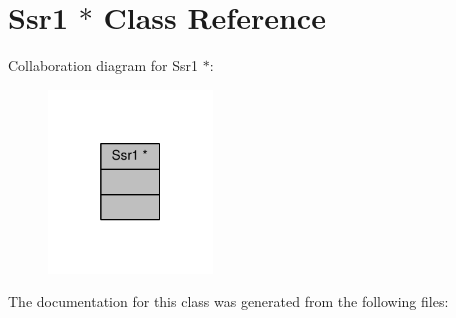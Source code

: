 \hypertarget{classSsr1_01_5}{}\section{Ssr1 $\ast$ Class Reference}
\label{classSsr1_01_5}


Collaboration diagram for Ssr1 $\ast$\+:\nopagebreak
\begin{figure}[H]
\begin{center}
\leavevmode
\includegraphics[width=124pt]{classSsr1_01_5__coll__graph}
\end{center}
\end{figure}


The documentation for this class was generated from the following files\+: